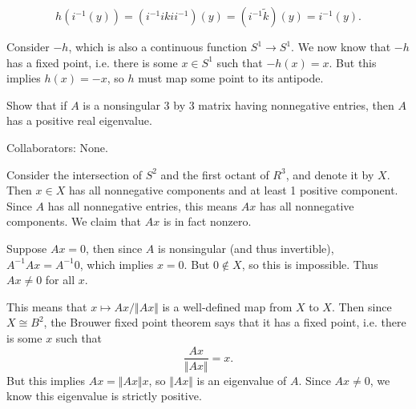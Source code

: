 \documentclass[twoside,10pt]{report}
\begin{document}
\[
	h(i^{-1}(y)) = (i^{-1}ikii^{-1})(y) = (i^{-1}\tilde{k})(y) = i^{-1}(y).
\] 

Consider $-h$, which is also a continuous function $S^{1}\to S^{1}$. We now know that $-h$ has a fixed point, i.e. there is some $x \in S^{1}$ such that $-h(x)=x$. But this implies $h(x)=-x$, so $h$ must map some point to its antipode.

\newpage
\begin{exer}[]
Show that if $A$ is a nonsingular 3 by 3 matrix having nonnegative entries, then $A$ has a positive real eigenvalue.
\end{exer}
{\color{blue}Collaborators: None.}

Consider the intersection of $S^{2}$ and the first octant of $R^{3}$, and denote it by $X$. Then $x \in X$ has all nonnegative components and at least 1 positive component. Since $A$ has all nonnegative entries, this means $Ax$ has all nonnegative components. We claim that $Ax$ is in fact nonzero.

Suppose $Ax=0$, then since $A$ is nonsingular (and thus invertible), $A^{-1}Ax=A^{-1}0$, which implies $x=0$. But $0 \not\in X$, so this is impossible. Thus $Ax \neq 0$ for all $x$.

This means that $x \mapsto Ax/{\Vert{Ax}\Vert}$ is a well-defined map from $X$ to $X$. Then since $X \cong B^{2}$, the Brouwer fixed point theorem says that it has a fixed point, i.e. there is some $x$ such that
\[
\frac{Ax}{{\Vert{Ax}\Vert}} =x.
\] 
But this implies $Ax = {\Vert{Ax}\Vert}x$, so ${\Vert{Ax}\Vert}$ is an eigenvalue of $A$. Since $Ax\neq 0$, we know this eigenvalue is strictly positive.
\end{document}
